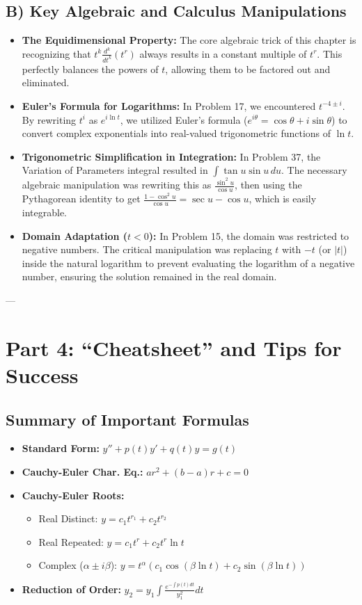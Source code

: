 \documentclass{article}
\begin{document}
\subsection{B) Key Algebraic and Calculus Manipulations}
\begin{itemize}
    \item \textbf{The Equidimensional Property:} The core algebraic trick of this chapter is recognizing that $t^k \frac{d^k}{dt^k}(t^r)$ always results in a constant multiple of $t^r$. This perfectly balances the powers of $t$, allowing them to be factored out and eliminated.
    \item \textbf{Euler's Formula for Logarithms:} In Problem 17, we encountered $t^{-4 \pm i}$. By rewriting $t^i$ as $e^{i \ln t}$, we utilized Euler's formula ($e^{i\theta} = \cos\theta + i\sin\theta$) to convert complex exponentials into real-valued trigonometric functions of $\ln t$.
    \item \textbf{Trigonometric Simplification in Integration:} In Problem 37, the Variation of Parameters integral resulted in $\int \tan u \sin u \, du$. The necessary algebraic manipulation was rewriting this as $\frac{\sin^2 u}{\cos u}$, then using the Pythagorean identity to get $\frac{1 - \cos^2 u}{\cos u} = \sec u - \cos u$, which is easily integrable.
    \item \textbf{Domain Adaptation ($t < 0$):} In Problem 15, the domain was restricted to negative numbers. The critical manipulation was replacing $t$ with $-t$ (or $|t|$) inside the natural logarithm to prevent evaluating the logarithm of a negative number, ensuring the solution remained in the real domain.
\end{itemize}

---

\section{Part 4: ``Cheatsheet'' and Tips for Success}

\subsection{Summary of Important Formulas}
\begin{itemize}
    \item \textbf{Standard Form:} $y'' + p(t)y' + q(t)y = g(t)$
    \item \textbf{Cauchy-Euler Char. Eq.:} $ar^2 + (b-a)r + c = 0$
    \item \textbf{Cauchy-Euler Roots:}
    \begin{itemize}
        \item Real Distinct: $y = c_1 t^{r_1} + c_2 t^{r_2}$
        \item Real Repeated: $y = c_1 t^r + c_2 t^r \ln t$
        \item Complex ($\alpha \pm i\beta$): $y = t^\alpha (c_1 \cos(\beta \ln t) + c_2 \sin(\beta \ln t))$
    \end{itemize}
    \item \textbf{Reduction of Order:} $y_2 = y_1 \int \frac{e^{-\int p(t) dt}}{y_1^2} dt$
\end{itemize}
\end{document}
